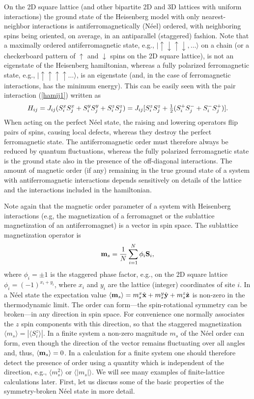 \documentclass[draft,numberedheadings]{aipproc}
\newcommand{\dn}{\downarrow}
\newcommand{\up}{\uparrow}
\newcommand{\half}{\hbox{$\frac{1}{2}$}}
\begin{document}
On the 2D square lattice (and other bipartite 2D and 3D lattices with uniform interactions) the ground state of the Heisenberg model with only 
nearest-neighbor interactions is antiferromagnetically (N\'eel) ordered, with neighboring spins being oriented, on average, in an antiparallel
(staggered) fashion. Note that a maximally ordered antiferromagnetic state, e.g., $|\up\dn\up\dn,\ldots\rangle$ on a chain (or a checkerboard pattern 
of $\up$ and $\dn$ spins on the 2D square lattice), is not an eigenstate of the Heisenberg hamiltonian, whereas a fully polarized ferromagnetic state, 
e.g., $|\up\up\up\up\ldots\rangle$, is an eigenstate (and, in the case of ferromagnetic interactions, has the minimum energy). This can be easily 
seen with the pair interaction (\ref{hamij1}) written as
\begin{equation}
H_{ij}=J_{ij}(S^x_iS^x_{j} + S^y_iS^y_{j} + S^z_iS^z_{j})=J_{ij}[S^z_iS^z_{j} + \half(S^+_iS^-_{j}+S^-_iS^+_{j})].
\label{hamij2}
\end{equation}
When acting on the perfect N\'eel state, the raising and lowering operators flip pairs of spins, causing local defects, whereas they destroy the 
perfect ferromagnetic state. The antiferromagnetic order must therefore always be reduced by quantum fluctuations, whereas the fully polarized 
ferromagnetic state is the ground state also in the presence of the off-diagonal interactions. The amount of magnetic order (if any) remaining 
in the true ground state of a system with antiferromagnetic interactions depends sensitively on details of the lattice and the interactions included 
in the hamiltonian. 

Note again that the magnetic order parameter of a system with Heisenberg interactions (e.g, the magnetization of a ferromagnet or the sublattice 
magnetization of an antiferromagnet) is a vector in spin space. The sublattice magnetization operator is
\begin{equation}
{\bf m}_s=\frac{1}{N} \sum_{i=1}^N \phi_i {\bf S}_i,
\label{msublattdef}
\end{equation}
where $\phi_i = \pm 1$ is the staggered phase factor, e.g., on the 2D square lattice $\phi_i = (-1)^{x_i+y_i}$, where $x_i$ and $y_i$ are the lattice 
(integer) coordinates of site $i$. In a N\'eel state the expectation value $\langle {\bf m}_s\rangle = m_s^x{\hat {\bf x}} + m_s^y{\hat {\bf y}} 
+ m_s^z{\hat {\bf z}}$ is non-zero in the thermodynamic limit. The order can form---the spin-rotational symmetry can be broken---in any direction in spin 
space. For convenience one normally associates the $z$ spin components with this direction, so that the staggered magnetization 
$\langle m_s\rangle=|\langle S^z_i\rangle|$. In a
finite system a non-zero magnitude $m_s$ of the N\'eel order can form, even though the direction of the vector remains fluctuating over all angles and, thus,
$\langle {\bf m}_s\rangle=0$. In a calculation for a finite system one should therefore detect the presence of order using a quantity which is independent 
of the direction, e.g., $\langle m_s^2\rangle $ or $\langle| m_s|\rangle$. We will see many examples of finite-lattice calculations later. First, let us 
discuss some of the basic properties of the symmetry-broken N\'eel state in more detail.
\end{document}
